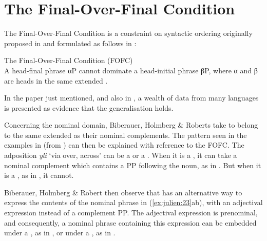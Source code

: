 \documentclass[output=paper]{LSP/langsci}
\begin{document}
\section{The Final-Over-Final Condition}

The Final-Over-Final Condition is a constraint on syntactic ordering originally proposed in \citet{Holmberg2000deriving} and formulated as follows in \citet[171]{BiberauerEtAl2014syntactic}:

\ea%
    \label{ex:julien:22}
	  The Final-Over-Final Condition (FOFC)\\
	  A head-final phrase αP cannot dominate a head-initial phrase βP, where α and β are heads in the same extended .
\z

In the paper just mentioned, and also in \citet{BiberauerEtAl2008}, a wealth of data from many languages is presented as evidence that the generalisation holds. 

Concerning the nominal domain, Biberauer, Holmberg \& Roberts take  to belong to the same extended  as their nominal complements. The pattern seen in the  examples in  (from \citealt[187]{BiberauerEtAl2014syntactic}) can then be explained with reference to the FOFC. The  adposition \textit{yli} ‘via over, across’ can be a  or a . When it is a , it can take a nominal complement which contains a PP following the noun, as in . But when it is a , as in , it cannot.

\ea%
    \label{ex:julien:23}
\z
\z

Biberauer, Holmberg \& Robert then observe that  has an alternative way to express the contents of the nominal phrase in (\ref{ex:julien:23}ab),
with an adjectival expression instead of a complement PP. The adjectival expression is prenominal, and consequently, a nominal phrase containing this expression can be embedded under a , as in , or under a , as in .
\end{document}
